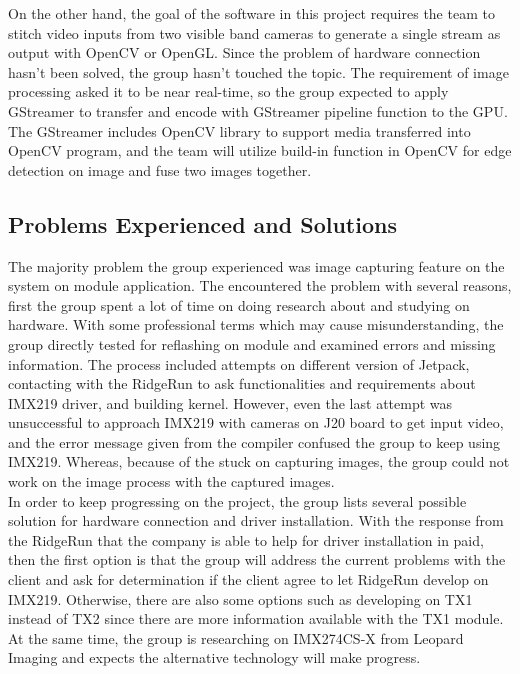 \documentclass[letterpaper,10pt,serif,draftclsnofoot,onecolumn,compsoc,titlepage]{IEEEtran}
\begin{document}
On the other hand, the goal of the software in this project requires the team to stitch video inputs from 
two visible band cameras to generate a single stream as output with OpenCV or OpenGL. Since the problem of 
hardware connection hasn’t been solved, the group hasn’t touched the topic. The requirement of image processing 
asked it to be near real-time, so the group expected to apply GStreamer to transfer and encode with GStreamer 
pipeline function to the GPU. The GStreamer includes OpenCV library to support media transferred into OpenCV 
program, and the team will utilize build-in function in OpenCV for edge detection on image and fuse two images 
together.\\

\subsection{Problems Experienced and Solutions}

The majority problem the group experienced was image capturing feature on the system on module application. 
The encountered the problem with several reasons, first the group spent a lot of time on doing research about 
and studying on hardware. With some professional terms which may cause misunderstanding, the group directly tested 
for reflashing on module and examined errors and missing information. The process included attempts on different 
version of Jetpack, contacting with the RidgeRun to ask functionalities and requirements about IMX219 driver, and
 building kernel. However, even the last attempt was unsuccessful to approach IMX219 with cameras on J20 board to 
 get input video, and the error message given from the compiler confused the group to keep using IMX219. Whereas, 
 because of the stuck on capturing images, the group could not work on the image process with the captured images.\\

 In order to keep progressing on the project, the group lists several possible solution for hardware connection 
 and driver installation. With the response from the RidgeRun that the company is able to help for driver 
 installation in paid, then the first option is that the group will address the current problems with the 
 client and ask for determination if the client agree to let RidgeRun develop on IMX219. Otherwise, there 
 are also some options such as developing on TX1 instead of TX2 since there are more information available 
 with the TX1 module. At the same time, the group is researching on IMX274CS-X from Leopard Imaging and 
 expects the alternative technology will make progress. \\
\end{document}
